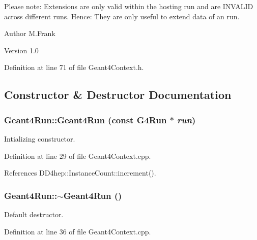 Please note: Extensions are only valid within the hosting run and are INVALID across different runs. Hence: They are only useful to extend data of an run.

\begin{DoxyAuthor}{Author}
M.Frank 
\end{DoxyAuthor}
\begin{DoxyVersion}{Version}
1.0 
\end{DoxyVersion}


Definition at line 71 of file Geant4Context.h.

\subsection{Constructor \& Destructor Documentation}
\hypertarget{class_d_d4hep_1_1_simulation_1_1_geant4_run_a93e0b66a97b9b04f65c1d59882d248f3}{
\subsubsection[{Geant4Run}]{\setlength{\rightskip}{0pt plus 5cm}Geant4Run::Geant4Run (const G4Run $\ast$ {\em run})}}
\label{class_d_d4hep_1_1_simulation_1_1_geant4_run_a93e0b66a97b9b04f65c1d59882d248f3}


Intializing constructor. 

Definition at line 29 of file Geant4Context.cpp.

References DD4hep::InstanceCount::increment().\hypertarget{class_d_d4hep_1_1_simulation_1_1_geant4_run_a9a508d7ab8cb68013b9e3cd370c2374a}{
\subsubsection[{$\sim$Geant4Run}]{\setlength{\rightskip}{0pt plus 5cm}Geant4Run::$\sim$Geant4Run ()}}
\label{class_d_d4hep_1_1_simulation_1_1_geant4_run_a9a508d7ab8cb68013b9e3cd370c2374a}


Default destructor. 

Definition at line 36 of file Geant4Context.cpp.


